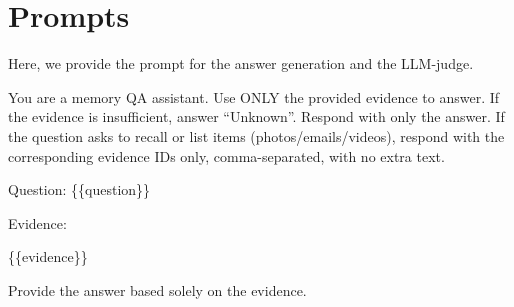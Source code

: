 \documentclass{article}
\theoremstyle{plain}
\theoremstyle{definition}
\theoremstyle{remark}
\begin{document}
\section{Prompts}
Here, we provide the prompt for the answer generation and the LLM-judge. 
\begin{tcolorbox}[colback=gray!10!white, colframe=black, arc=2mm, title=\small \textbf{Answerer Prompt}]
You are a memory QA assistant. Use ONLY the provided evidence to answer.
If the evidence is insufficient, answer ``Unknown''.
Respond with only the answer.
If the question asks to recall or list items (photos/emails/videos),
respond with the corresponding evidence IDs only, comma-separated, with no extra text.
\par\medskip

Question: \{\{question\}\}
\par\medskip

Evidence:
\par
\{\{evidence\}\}
\par\medskip

Provide the answer based solely on the evidence.
\end{tcolorbox}
\end{document}
